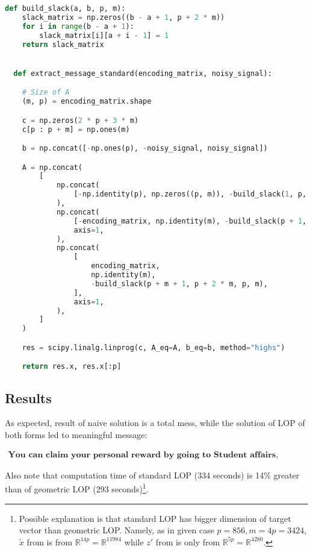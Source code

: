 \documentclass{article}
\def\R{\mathbb{R}}
\def\xt{\tilde{x}}
\begin{document}
\begin{minipage}{\linewidth}
  \begin{lstlisting}[language=Python, caption={Message decryption based on solution of LOP in standard form. The output is tuple of solution of the problem, and decrypted message itself}, label={lst:std}]
  def build_slack(a, b, p, m):
    slack_matrix = np.zeros((b - a + 1, p + 2 * m))
    for i in range(b - a + 1):
        slack_matrix[i][a + i - 1] = 1
    return slack_matrix


  def extract_message_standard(encoding_matrix, noisy_signal):

    # Size of A
    (m, p) = encoding_matrix.shape

    c = np.zeros(2 * p + 3 * m)
    c[p : p + m] = np.ones(m)

    b = np.concat([-np.ones(p), -noisy_signal, noisy_signal])

    A = np.concat(
        [
            np.concat(
                [-np.identity(p), np.zeros((p, m)), -build_slack(1, p, p, m)], axis=1
            ),
            np.concat(
                [-encoding_matrix, np.identity(m), -build_slack(p + 1, p + m, p, m)],
                axis=1,
            ),
            np.concat(
                [
                    encoding_matrix,
                    np.identity(m),
                    -build_slack(p + m + 1, p + 2 * m, p, m),
                ],
                axis=1,
            ),
        ]
    )

    res = scipy.linalg.linprog(c, A_eq=A, b_eq=b, method="highs")

    return res.x, res.x[:p]
\end{lstlisting}
\end{minipage}

\subsection{Results}
As expected, result of naive solution is a total mess, while the solution of LOP of both forms led to meaningful message:

\begin{equation*}
  \begin{aligned}
    \textbf{You can claim your personal reward by going to Student affairs, giving you code=1083 and ask for you reward}
  \end{aligned}
\end{equation*}

Also note that computation time of standard LOP (334 seconds) is 14\% greater than of geometric LOP (293 seconds)\footnote{Possible explanation is that standard LOP has bigger dimension of target vector than geometric LOP. Namely, as in given case $p=856, m=4p=3424$, $\xt$ from  is from $\R^{14p} = \R^{11984}$ while $z'$ from  is only from $\R^{5p} = \R^{4280}$.
}.
\end{document}
